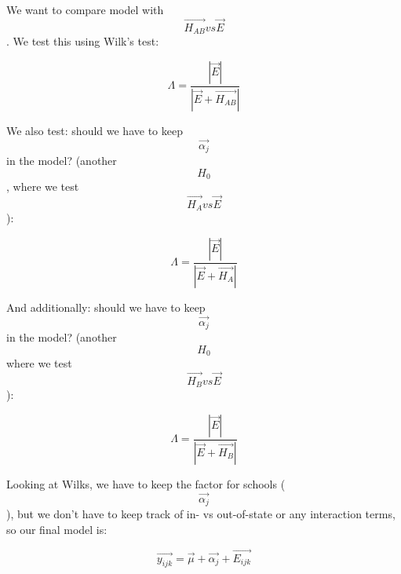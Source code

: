 We want to compare model with \[\vec{H_{AB}} vs \vec{E}\]. We test this
using Wilk's test:

\[\Lambda = \frac{| \vec{E} |}{| \vec{E} + \vec{H_{AB}} |}\]

We also test: should we have to keep \[ \vec{\alpha_j} \] in the model?
(another \[H_0\], where we test \[\vec{H_A} vs \vec{E}\]):

\[\Lambda = \frac{| \vec{E} |}{| \vec{E} + \vec{H_{A}} |}\]

And additionally: should we have to keep \[ \vec{\alpha_j} \] in the
model? (another \[H_0\] where we test \[\vec{H_B} vs \vec{E}\]):

\[\Lambda = \frac{| \vec{E} |}{| \vec{E} + \vec{H_{B}} |}\]

Looking at Wilks, we have to keep the factor for schools
(\[\vec{\alpha_j}\]), but we don't have to keep track of in- vs
out-of-state or any interaction terms, so our final model is:

\[\vec{y_{ijk}} = \vec{\mu} + \vec{\alpha_j} + \vec{E_{ijk}}\]
